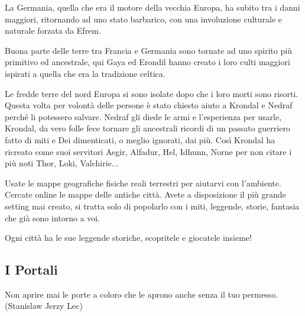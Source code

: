 \begin{multicols}{2}
La Germania, quella che era il motore della vecchia Europa, ha subito tra i danni maggiori, ritornando ad uno stato barbarico, con una involuzione culturale e naturale forzata da Efrem.

Buona parte delle terre tra Francia e Germania sono tornate ad uno spirito più primitivo ed ancestrale, qui Gaya ed Erondil hanno creato i loro culti maggiori ispirati a quella che era la tradizione celtica.

Le fredde terre del nord Europa si sono isolate dopo che i loro morti sono risorti. Questa volta per volontà delle persone è stato chiesto aiuto a Krondal e Nedraf perché li potessero salvare. Nedraf gli diede le armi e l'esperienza per usarle, Krondal, da vero folle fece tornare gli ancestrali ricordi di un passato guerriero fatto di miti e Dei dimenticati, o meglio ignorati, dai più.
Così Krondal ha ricreato come suoi servitori Aegir, Alfadur, Hel, Idhunn, Norne per non citare i più noti Thor, Loki, Valchirie...

\begin{changemargin}{0.3cm}{0.3cm}\begin{narratore} %
Usate le mappe geografiche fisiche reali terrestri per aiutarvi con l'ambiente. Cercate online le mappe delle antiche città. Avete a disposizione il più grande setting mai creato, si tratta solo di popolarlo con i miti, leggende, storie, fantasia che già sono intorno a voi.

Ogni città ha le sue leggende storiche, scopritele e giocatele insieme!
\end{narratore}\end{changemargin}

\end{multicols}

\subsection{I Portali}

\begin{changemargin}{0.3cm}{0.3cm}\begin{enfasi}{
Non aprire mai le porte a coloro che le aprono anche senza il tuo permesso. (Stanislaw Jerzy Lec)}\end{enfasi}\end{changemargin}\medskip


